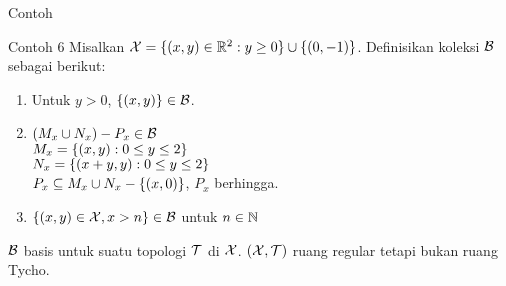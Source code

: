 \begin{frame}{Contoh}
    \begin{block}{Contoh 6}
        Misalkan $\mathcal{X} = \{(x,y)\in \mathbb{R}^2:y\geq 0\}\cup\{(0,-1)\}$. Definisikan koleksi $\mathcal{B}$ sebagai berikut:
        \begin{enumerate}
            \item Untuk $y > 0$, $\{(x,y)\}\in\mathcal{B}$.
            \item $(M_x\cup N_x)-P_x \in \mathcal{B}$\\
            $M_x=\{(x,y):0\leq y \leq 2\}$\\
            $N_x=\{(x+y,y):0\leq y \leq 2\}$\\
            $P_x\subseteq M_x\cup N_x-\{(x,0)\}$, $P_x$ berhingga.
            \item $\{(x,y)\in \mathcal{X}, x > n\}\in \mathcal{B}$ untuk $n\in\mathbb{N}$
        \end{enumerate}
        $\mathcal{B}$ basis untuk suatu topologi $\mathcal{T}$ di $\mathcal{X}$. $(\mathcal{X},\mathcal{T})$ ruang regular tetapi bukan ruang Tycho.
    \end{block}
\end{frame}

